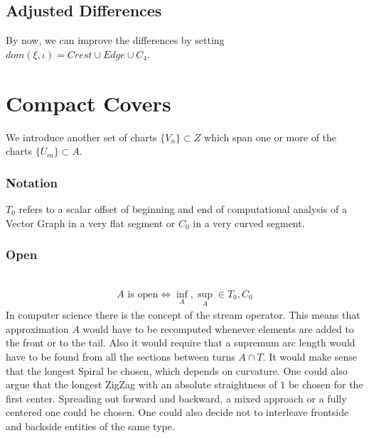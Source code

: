 \documentclass{report}
\begin{document}
\subsection*{Adjusted Differences}
By now, we can improve the differences by setting $dom(\xi,\iota)=Crest \cup Edge \cup C_{4}$.

\section{Compact Covers}
We introduce another set of charts $\{V_{n}\} \subset Z$ which span one or more of the charts $\{U_{m}\} \subset A$.
\subsubsection*{Notation}
$T_{0}$ refers to a scalar offset of beginning and end of computational analysis of a Vector Graph in a very flat segment or $C_{0}$ in a very curved segment.
\subsubsection*{Open}
~\cite{Mortad}
\begin{align}
A \text{ is open} \Leftrightarrow \inf_{A},\sup_{A}\in T_{0},C_{0}
\end{align}
In computer science there is the concept of the stream operator. This means that approximation $A$ would have to be recomputed whenever elements are added to the front or to the tail. Also it would require that a supremum arc length would have to be found from all the sections between turns $A \cap T$. It would make sense that the longest Spiral be chosen, which depends on curvature. One could also argue that the longest ZigZag with an absolute straightness of $1$ be chosen for the first center. Spreading out forward and backward, a mixed approach or a fully centered one could be chosen. One could also decide not to interleave frontside and backside entities of the same type.
\end{document}
